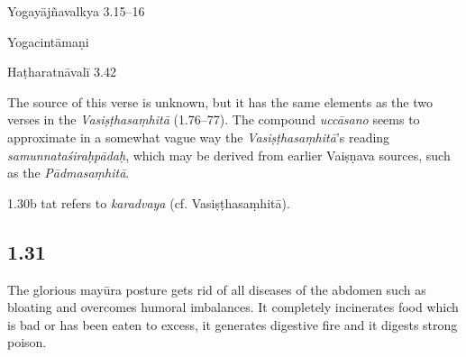\begin{ekdosis}
\begin{sources}[hp01_030]
Yogayājñavalkya 3.15–16

\begin{versinnote}
\end{versinnote}

\end{sources}

\begin{testimonia}[hp01_030]
Yogacintāmaṇi

\begin{versinnote}
\end{versinnote}

Haṭharatnāvalī 3.42

\begin{versinnote}
\end{versinnote}

\end{testimonia}

\begin{philcomm}[hp01_030]
The source of this verse is unknown, but it has the same elements as the two verses in the \emph{Vasiṣṭhasaṃhitā} (1.76–77). The compound \emph{uccāsano} seems to approximate in a somewhat vague way the \emph{Vasiṣṭhasaṃhitā}’s reading \emph{samunnataśiraḥpādaḥ}, which may be derived from earlier Vaiṣṇava sources, such as the \textit{Pādmasaṃhitā}. 
 

1.30b tat refers to \emph{karadvaya} (cf. Vasiṣṭhasaṃhitā).
\end{philcomm}

\subsection*{1.31}
\begin{translation}[hp01_031]
The glorious mayūra posture gets rid of all diseases of the abdomen such as bloating and overcomes humoral imbalances. It completely incinerates food which is bad or has been eaten to excess, it generates digestive fire and it digests strong poison.
\end{translation}


\end{ekdosis}
